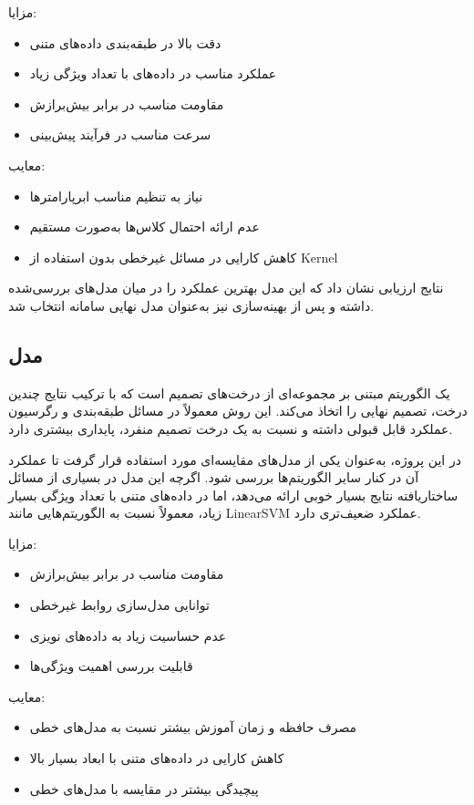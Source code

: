 مزایا:
\begin{itemize}
	\item دقت بالا در طبقه‌بندی داده‌های متنی
	\item عملکرد مناسب در داده‌های با تعداد ویژگی زیاد
	\item مقاومت مناسب در برابر بیش‌برازش 
	\item سرعت مناسب در فرآیند پیش‌بینی
\end{itemize}
معایب:
\begin{itemize}
	\item نیاز به تنظیم مناسب ابرپارامترها
	\item عدم ارائه احتمال کلاس‌ها به‌صورت مستقیم
	\item کاهش کارایی در مسائل غیرخطی بدون استفاده از Kernel
\end{itemize}
نتایج ارزیابی نشان داد که این مدل بهترین عملکرد را در میان مدل‌های بررسی‌شده داشته و پس از بهینه‌سازی نیز به‌عنوان مدل نهایی سامانه انتخاب شد.
\subsection{مدل }
 یک الگوریتم مبتنی بر مجموعه‌ای از درخت‌های تصمیم  است که با ترکیب نتایج چندین درخت، تصمیم نهایی را اتخاذ می‌کند. این روش معمولاً در مسائل طبقه‌بندی و رگرسیون عملکرد قابل قبولی داشته و نسبت به یک درخت تصمیم منفرد، پایداری بیشتری دارد.

در این پروژه،  به‌عنوان یکی از مدل‌های مقایسه‌ای مورد استفاده قرار گرفت تا عملکرد آن در کنار سایر الگوریتم‌ها بررسی شود. اگرچه این مدل در بسیاری از مسائل ساختاریافته نتایج بسیار خوبی ارائه می‌دهد، اما در داده‌های متنی با تعداد ویژگی بسیار زیاد، معمولاً نسبت به الگوریتم‌هایی مانند LinearSVM عملکرد ضعیف‌تری دارد.

مزایا:
\begin{itemize}
	\item مقاومت مناسب در برابر بیش‌برازش
	\item توانایی مدل‌سازی روابط غیرخطی
	\item عدم حساسیت زیاد به داده‌های نویزی
	\item قابلیت بررسی اهمیت ویژگی‌ها 
\end{itemize}
معایب:
\begin{itemize}
	\item مصرف حافظه و زمان آموزش بیشتر نسبت به مدل‌های خطی
	\item کاهش کارایی در داده‌های متنی با ابعاد بسیار بالا
	\item پیچیدگی بیشتر در مقایسه با مدل‌های خطی
\end{itemize}
